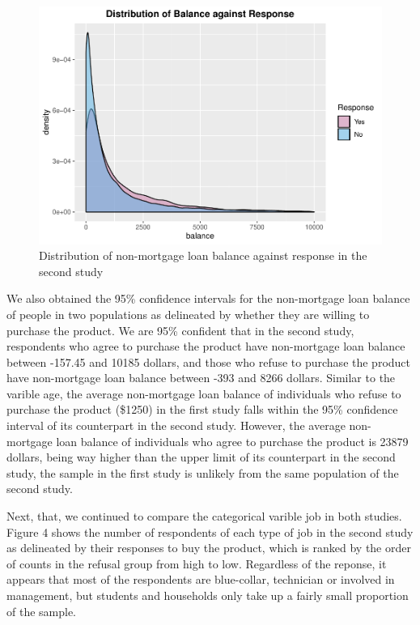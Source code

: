 \documentclass[]{article}
\begin{document}
\begin{figure}

{\centering \includegraphics{Compiled-Technical-Report_files/figure-latex/unnamed-chunk-4-1} 

}

\caption{Distribution of non-mortgage loan balance against response in the second study}\label{fig:unnamed-chunk-4}
\end{figure}

We also obtained the 95\% confidence intervals for the non-mortgage loan
balance of people in two populations as delineated by whether they are
willing to purchase the product. We are 95\% confident that in the
second study, respondents who agree to purchase the product have
non-mortgage loan balance between -157.45 and 10185 dollars, and those
who refuse to purchase the product have non-mortgage loan balance
between -393 and 8266 dollars. Similar to the varible age, the average
non-mortgage loan balance of individuals who refuse to purchase the
product (\$1250) in the first study falls within the 95\% confidence
interval of its counterpart in the second study. However, the average
non-mortgage loan balance of individuals who agree to purchase the
product is 23879 dollars, being way higher than the upper limit of its
counterpart in the second study, the sample in the first study is
unlikely from the same population of the second study.

Next, that, we continued to compare the categorical varible job in both
studies. Figure 4 shows the number of respondents of each type of job in
the second study as delineated by their responses to buy the product,
which is ranked by the order of counts in the refusal group from high to
low. Regardless of the reponse, it appears that most of the respondents
are blue-collar, technician or involved in management, but students and
households only take up a fairly small proportion of the sample.
\end{document}
